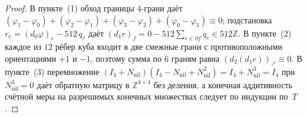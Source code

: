 \begin{proof}
В пункте~(1) обход границы $4$-грани даёт $(\varphi_1 - \varphi_0) + (\varphi_2 - \varphi_1) + (\varphi_3 - \varphi_2) + (\varphi_0 - \varphi_3) \equiv 0$; подстановка $r_e = (d_0\varphi)_e - 512\,q_e$ даёт $(d_1 r)_f = 0 - 512\sum_{e\in\partial f} q_e \in 512\mathbb{Z}$. В пункте~(2) каждое из $12$ рёбер куба входит в две смежные грани с противоположными ориентациями $+1$ и $-1$, поэтому сумма по $6$ граням равна $(d_2(d_1 e))_{\square^3} \equiv 0$. В пункте~(3) перемножение $(I_4 + N_{\mathrm{nil}})(I_4 - N_{\mathrm{nil}} + N_{\mathrm{nil}}^2) = I_4 + N_{\mathrm{nil}}^3 = I_4$ при $N_{\mathrm{nil}}^3 = 0$ даёт обратную матрицу в $\mathbb{Z}^{4\times 4}$ без деления, а конечная аддитивность счётной меры на разрешимых конечных множествах следует по индукции по~$T$.
\end{proof}

